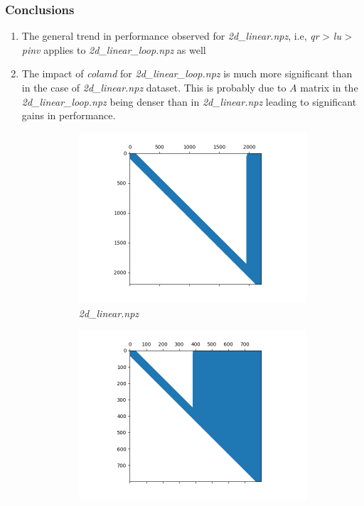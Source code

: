 \documentclass[12pt, a4paper]{article}
\begin{document}
\subsubsection{Conclusions}
\begin{enumerate}
  \item The general trend in performance observed for \textit{2d\_linear.npz}, i.e, \textit{qr} > \textit{lu} > \textit{pinv} applies to \textit{2d\_linear\_loop.npz} as well
  \item The impact of \textit{colamd} for \textit{2d\_linear\_loop.npz} is much more significant than in the case of \textit{2d\_linear.npz} dataset. This is probably due to $A$ matrix in the \textit{2d\_linear\_loop.npz} being denser than in \textit{2d\_linear.npz} leading to significant gains in performance.
  \begin{figure}[H]
    \centering
    \begin{subfigure}[b]{0.45\textwidth}
      \includegraphics[width=\textwidth]{./results/linear/lu_2d_linear_sparsity.png}
      \caption{\textit{2d\_linear.npz}}
    \end{subfigure}
    \hfill
    \begin{subfigure}[b]{0.45\textwidth}
      \includegraphics[width=\textwidth]{./results/linear/lu_2d_linear_loop_sparsity.png}

\end{subfigure}
\end{figure}
\end{enumerate}
\end{document}
